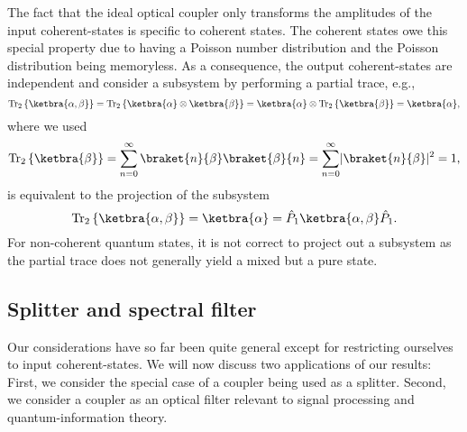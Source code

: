 The fact that the ideal optical coupler only transforms the amplitudes of the input coherent-states is specific to coherent states.
The coherent states owe this special property due to having a Poisson number distribution and the Poisson distribution being memoryless.
As a consequence, the output coherent-states are independent and consider a subsystem by performing a partial trace, e.g.,
\begin{equation}
	\trace_2\left\{
		\ketbra{\alpha,\beta}
	\right\}
	=
	\trace_2\left\{
		\ketbra{\alpha}
		\otimes
		\ketbra{\beta}
	\right\}
	=
	\ketbra{\alpha}
	\otimes
	\trace_2\left\{
		\ketbra{\beta}
	\right\}
	=
	\ketbra{\alpha}
	,
\end{equation}
where we used
\begin{equation}
	\trace_2\left\{
		\ketbra{\beta}
	\right\}
	=
	\sum_{n=0}^\infty
	\braket{n}{\beta}
	\braket{\beta}{n}
	=
	\sum_{n=0}^\infty
	\abs{\braket{n}{\beta}}^2
	=
	1
	,
\end{equation}
is equivalent to the projection of the subsystem
\begin{equation}
	\trace_2\left\{
		\ketbra{\alpha,\beta}
	\right\}
	=
	\ketbra{\alpha}
	=
	\hat{P}_1
	\ketbra{\alpha,\beta}
	\hat{P}_1
	.
\end{equation}
For non-coherent quantum states, it is not correct to project out a subsystem as the partial trace does not generally yield a mixed but a pure state.

\subsection{Splitter and spectral filter}

Our considerations have so far been quite general except for restricting ourselves to input coherent-states.
We will now discuss two applications of our results:
First, we consider the special case of a coupler being used as a splitter. 
Second, we consider a coupler as an optical filter relevant to signal processing and quantum-information theory.

